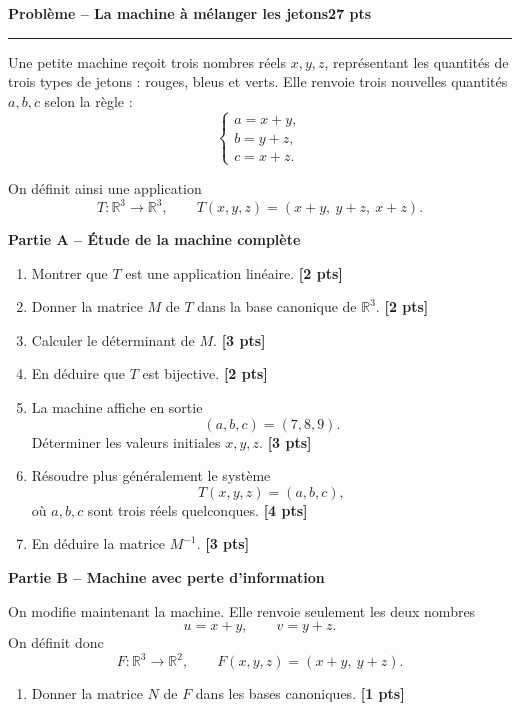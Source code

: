 \documentclass[11pt,a4paper]{article}
\newcommand{\pts}[1]{\hfill \textbf{[#1 pts]}}
\newcommand{\R}{\mathbb{R}}
\newcounter{probleme}
\newenvironment{probleme}[2]{
    \refstepcounter{probleme}
    \vspace{0.5cm}
    {\Large\color{bleu}\textbf{Problème \theprobleme{} -- #1}}\hfill \textbf{#2 pts}
    \par\medskip
    \hrule
    \medskip
}{\vspace{0.4cm}}
\newcommand{\partie}[1]{
    \vspace{0.25cm}
    {\large\color{gris}\textbf{#1}}
    \par\smallskip
}
\begin{document}
\begin{probleme}{La machine à mélanger les jetons}{27}

Une petite machine reçoit trois nombres réels \(x,y,z\), représentant les quantités de trois types de jetons : rouges, bleus et verts. Elle renvoie trois nouvelles quantités \(a,b,c\) selon la règle :
\[
\begin{cases}
a=x+y,\\
b=y+z,\\
c=x+z.
\end{cases}
\]

On définit ainsi une application
\[
T:\R^3\longrightarrow \R^3,
\qquad
T(x,y,z)=(x+y,\ y+z,\ x+z).
\]

\partie{Partie A -- Étude de la machine complète}

\begin{enumerate}
    \item Montrer que \(T\) est une application linéaire. \pts{2}

    \item Donner la matrice \(M\) de \(T\) dans la base canonique de \(\R^3\). \pts{2}

    \item Calculer le déterminant de \(M\). \pts{3}

    \item En déduire que \(T\) est bijective. \pts{2}

    \item La machine affiche en sortie
    \[
    (a,b,c)=(7,8,9).
    \]
    Déterminer les valeurs initiales \(x,y,z\). \pts{3}

    \item Résoudre plus généralement le système
    \[
    T(x,y,z)=(a,b,c),
    \]
    où \(a,b,c\) sont trois réels quelconques. \pts{4}

    \item En déduire la matrice \(M^{-1}\). \pts{3}
\end{enumerate}

\partie{Partie B -- Machine avec perte d'information}

On modifie maintenant la machine. Elle renvoie seulement les deux nombres
\[
u=x+y,
\qquad
v=y+z.
\]
On définit donc
\[
F:\R^3\longrightarrow \R^2,
\qquad
F(x,y,z)=(x+y,\ y+z).
\]

\begin{enumerate}[resume]
    \item Donner la matrice \(N\) de \(F\) dans les bases canoniques. \pts{1}


\end{enumerate}
\end{probleme}
\end{document}
